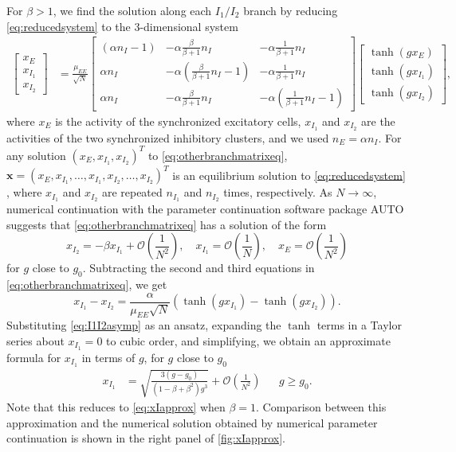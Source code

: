 \documentclass[reqno]{siamonline190516}
\newcommand{\xvec}{\mathbf{x}}
\begin{document}
For $\beta > 1$, we find the solution along each $I_1/I_2$ branch by reducing \cref{eq:reducedsystem} to the 3-dimensional system
\begin{equation}\label{eq:otherbranchmatrixeq}
 \begin{aligned}
 \begin{bmatrix} x_E\\x_{I_1}\\x_{I_2}\end{bmatrix} 
 &= \frac{\mu_{EE}}{\sqrt{N}} 
 \begin{bmatrix} (\alpha n_I - 1) & -\alpha \frac{\beta}{\beta+1} n_I & - \alpha \frac{1}{\beta+1} n_I  \\
    \alpha n_I  & -\alpha \left(\frac{\beta}{\beta+1} n_I-1\right) & - \alpha \frac{1}{\beta+1} n_I  \\
    \alpha n_I & -\alpha \frac{\beta}{\beta+1} n_I & -\alpha \left(\frac{1}{\beta+1} n_I-1\right)
 \end{bmatrix}
 \begin{bmatrix} \tanh(g x_E) \\\tanh ( g x_{I_1} ) \\\tanh(g x_{I_2})\end{bmatrix},
 \end{aligned}
 \end{equation}
 where $x_E$ is the activity of the synchronized excitatory cells, $x_{I_1}$ and $x_{I_2}$ are the activities of the two synchronized inhibitory clusters, and we used $n_E = \alpha n_I$. For any solution $(x_E, x_{I_1}, x_{I_2})^T$ to \cref{eq:otherbranchmatrixeq}, $\xvec = (x_E, x_{I_1}, \dots, x_{I_1}, x_{I_2}, \dots, x_{I_2})^T$ is an equilibrium solution to \cref{eq:reducedsystem} , where $x_{I_1}$ and $x_{I_2}$ are repeated $n_{I_1}$ and $n_{I_2}$ times, respectively. As $N \rightarrow \infty$, numerical continuation with the parameter continuation software package AUTO \cite{AUTO} suggests that \cref{eq:otherbranchmatrixeq} has a solution of the form
\begin{equation}\label{eq:I1I2asymp}
    x_{I_2} = -\beta x_{I_1} + \mathcal{O}\left( \frac{1}{N^2} \right), \quad 
    x_{I_1} = \mathcal{O}\left( \frac{1}{N} \right), \quad
     x_E = \mathcal{O}\left( \frac{1}{N^2} \right)
\end{equation}
for $g$ close to $g_0$. Subtracting the second and third equations in \cref{eq:otherbranchmatrixeq}, we get
\[
 x_{I_1} - x_{I_2} = \frac{\alpha}{\mu_{EE}\sqrt{N}}\left( \tanh(g x_{I_1}) - \tanh(g x_{I_2}) \right).
 \]
Substituting \cref{eq:I1I2asymp} as an ansatz, expanding the $\tanh$ terms in a Taylor series about $x_{I_1} = 0$ to cubic order, and simplifying, we obtain an approximate formula for $x_{I_1}$ in terms of $g$, for $g$ close to $g_0$
 \begin{align}\label{eq:XI1}
 x_{I_1} &= \sqrt{ \frac{ 3(g - g_0) }{ (1 - \beta + \beta^2 )g^3}} + \mathcal{O}\left( \frac{1}{N^2}\right)&& g \geq g_0.
\end{align}
Note that this reduces to \cref{eq:xIapprox} when $\beta = 1$. Comparison between this approximation and the numerical solution obtained by numerical parameter continuation is shown in the right panel of \cref{fig:xIapprox}.
\end{document}
